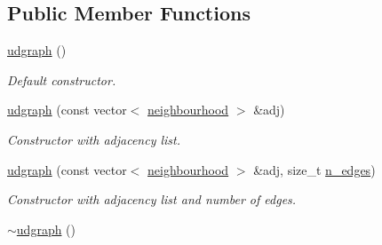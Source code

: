\subsection*{Public Member Functions}
\begin{DoxyCompactItemize}
\item 
\hypertarget{classlgraph_1_1utils_1_1udgraph_ac67664542d6a8e674781adc1466905af}{\hyperlink{classlgraph_1_1utils_1_1udgraph_ac67664542d6a8e674781adc1466905af}{udgraph} ()}\label{classlgraph_1_1utils_1_1udgraph_ac67664542d6a8e674781adc1466905af}

\begin{DoxyCompactList}\small\item\em Default constructor. \end{DoxyCompactList}\item 
\hyperlink{classlgraph_1_1utils_1_1udgraph_a4f8b95585600eda6f35e8d67c5c4418c}{udgraph} (const vector$<$ \hyperlink{namespacelgraph_1_1utils_a0f2ef47028a466d26841709e705390ac}{neighbourhood} $>$ \&adj)
\begin{DoxyCompactList}\small\item\em Constructor with adjacency list. \end{DoxyCompactList}\item 
\hyperlink{classlgraph_1_1utils_1_1udgraph_a2a259a0f2d4148063b1be717c956b884}{udgraph} (const vector$<$ \hyperlink{namespacelgraph_1_1utils_a0f2ef47028a466d26841709e705390ac}{neighbourhood} $>$ \&adj, size\-\_\-t \hyperlink{classlgraph_1_1utils_1_1xxgraph_af3f7c3835406c2cbf70479ae1c0253c9}{n\-\_\-edges})
\begin{DoxyCompactList}\small\item\em Constructor with adjacency list and number of edges. \end{DoxyCompactList}\item 
\hypertarget{classlgraph_1_1utils_1_1udgraph_afcdd7cc64bcb8d41ba230742753c6867}{\hyperlink{classlgraph_1_1utils_1_1udgraph_afcdd7cc64bcb8d41ba230742753c6867}{$\sim$udgraph} ()}\label{classlgraph_1_1utils_1_1udgraph_afcdd7cc64bcb8d41ba230742753c6867}


\end{DoxyCompactItemize}
